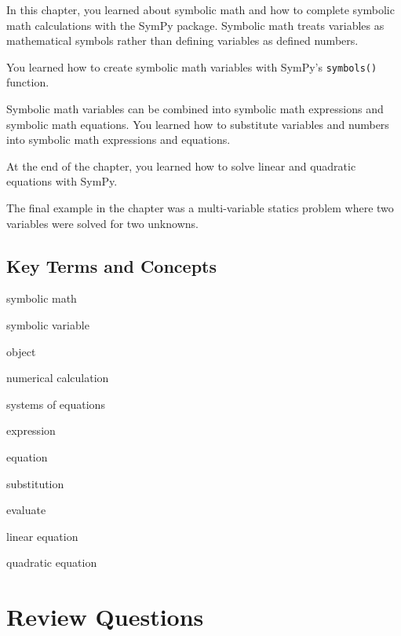 \documentclass{book}
\newenvironment{key_terms}{\begin{multicols}{3}}{\end{multicols}} %
\begin{document}
    




    
        In this chapter, you learned about symbolic math and how to complete
symbolic math calculations with the SymPy package. Symbolic math treats
variables as mathematical symbols rather than defining variables as
defined numbers.

You learned how to create symbolic math variables with SymPy's
\lstinline!symbols()! function.

Symbolic math variables can be combined into symbolic math expressions
and symbolic math equations. You learned how to substitute variables and
numbers into symbolic math expressions and equations.

At the end of the chapter, you learned how to solve linear and quadratic
equations with SymPy.

The final example in the chapter was a multi-variable statics problem
where two variables were solved for two unknowns.
    




    
        \subsection{Key Terms and Concepts}\label{key-terms-and-concepts}
    




    
        \begin{key_terms}
        symbolic math

symbolic variable

object

numerical calculation

systems of equations

expression

equation

substitution

evaluate

linear equation

quadratic equation
        \end{key_terms}

    




    
        \section{Review Questions}\label{review-questions}
    
\end{document}
